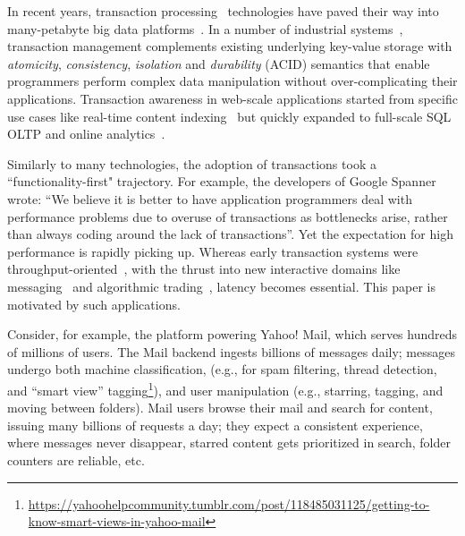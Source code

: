 In recent years, transaction processing~\cite{Gray:1992:TPC:573304} technologies have paved their way into many-petabyte big data 
platforms~\cite{Spanner2012,Percolator2010,Omid2017}. 
In a number of industrial systems~\cite{Percolator2010,Omid2017,tephra,cockroach}, transaction management complements 
existing underlying key-value storage with {\em atomicity}, {\em consistency}, {\em isolation\/} and 
{\em durability} (ACID) semantics that enable programmers perform 
complex data manipulation without over-complicating their applications. Transaction awareness 
in web-scale applications started from specific use cases like real-time content indexing~\cite{Percolator2010,
Omid2017} but quickly expanded to 
full-scale SQL OLTP and online analytics~\cite{Phoenix, F1-2013}.

Similarly to many technologies, the adoption of transactions took a  ``functionality-first" trajectory. 
For example, the developers of Google Spanner~\cite{Spanner2012} wrote: ``We believe it
is better to have application programmers deal with performance problems due to overuse 
of transactions as bottlenecks arise, rather than always coding around the lack of transactions''. 
Yet the expectation for high performance is rapidly picking up. %
Whereas early 
transaction systems were throughput-oriented~\cite{Percolator2010, Omid2017}, 
with the thrust into new interactive domains like messaging~\cite{Borthakur:2011} and algorithmic 
trading~\cite{opentsdb}, latency becomes essential. This paper is motivated by such  applications.

Consider, for example, the platform powering Yahoo! Mail, which serves hundreds of millions of users. 
The Mail backend ingests billions of messages daily; messages undergo both machine 
classification, (e.g., for spam filtering, thread detection, and ``smart view'' tagging\footnote{\footnotesize{\url{
https://yahoohelpcommunity.tumblr.com/post/118485031125/getting-to-know-smart-views-in-yahoo-mail}}}),
and user manipulation (e.g., starring, tagging, and moving between folders).    
Mail users browse their mail and search for content, issuing many billions of requests a day; they
expect a consistent experience, where messages never 
disappear, starred content gets prioritized in search, folder counters are reliable, etc.

